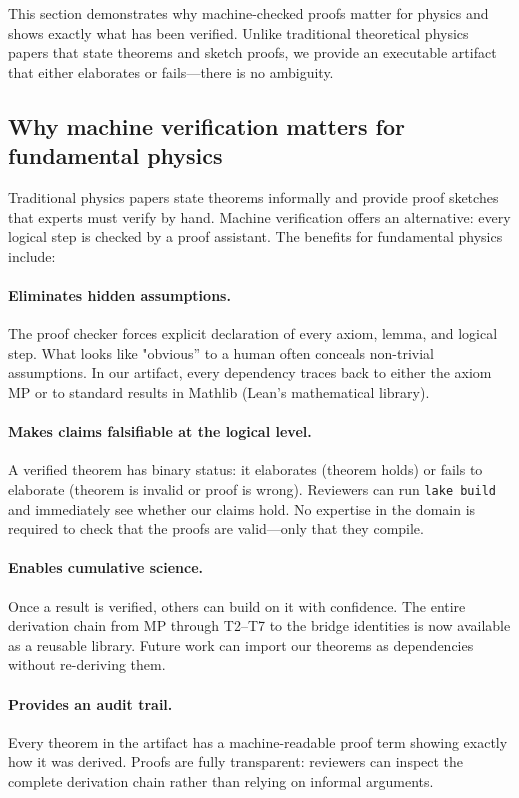 \documentclass[11pt]{article}
\begin{document}
This section demonstrates why machine-checked proofs matter for physics and shows exactly what has been verified. Unlike traditional theoretical physics papers that state theorems and sketch proofs, we provide an executable artifact that either elaborates or fails—there is no ambiguity.

\subsection{Why machine verification matters for fundamental physics}

Traditional physics papers state theorems informally and provide proof sketches that experts must verify by hand. Machine verification offers an alternative: every logical step is checked by a proof assistant. The benefits for fundamental physics include:

\paragraph{Eliminates hidden assumptions.} The proof checker forces explicit declaration of every axiom, lemma, and logical step. What looks like "obvious'' to a human often conceals non-trivial assumptions. In our artifact, every dependency traces back to either the axiom MP or to standard results in Mathlib (Lean's mathematical library).

\paragraph{Makes claims falsifiable at the logical level.} A verified theorem has binary status: it elaborates (theorem holds) or fails to elaborate (theorem is invalid or proof is wrong). Reviewers can run \texttt{lake build} and immediately see whether our claims hold. No expertise in the domain is required to check that the proofs are valid—only that they compile.

\paragraph{Enables cumulative science.} Once a result is verified, others can build on it with confidence. The entire derivation chain from MP through T2--T7 to the bridge identities is now available as a reusable library. Future work can import our theorems as dependencies without re-deriving them.

\paragraph{Provides an audit trail.} Every theorem in the artifact has a machine-readable proof term showing exactly how it was derived. Proofs are fully transparent: reviewers can inspect the complete derivation chain rather than relying on informal arguments.
\end{document}
